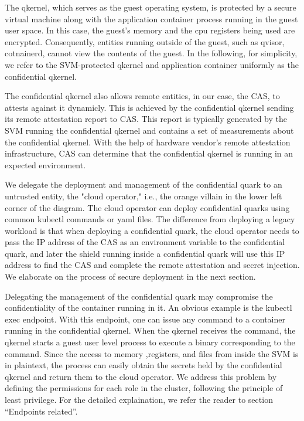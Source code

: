 The qkernel, which serves as the guest operating system, is protected by a secure virtual machine along with the application container process running in the guest user space. In this case, the guest's memory and the cpu registers being used are encrypted. Consequently, entities running outside of the guest, such as qvisor, cotnainerd, cannot view the contents of the guest.
In the following, for simplicity, we refer to the SVM-protected qkernel and application container uniformly as the confidential qkernel. 

The confidential qkernel also allows remote entities, in our case, the CAS, to attests against it dynamicly. This is achieved by the confidential qkernel sending its remote attestation report to CAS. 
This report is typically generated by the SVM running the confidential qkernel and contains a set of measurements about the confidential qkernel. With the help of hardware vendor's remote attestation infrastructure, CAS can determine that the 
confidential qkernel is running in an expected environment.

We delegate the deployment and management of the confidential quark to an untrusted entity, the "cloud operator," i.e., the orange villain in the lower left corner of the diagram. The cloud operator can deploy confidential quarks using 
common kubectl commands or yaml files. The difference from deploying a legacy workload is that when deploying a confidential quark, the cloud operator needs to pass 
the IP address of the CAS as an environment variable to the confidential quark, and later the shield running inside a confidential quark will use this IP address to find the CAS and complete the remote attestation and secret injection. We elaborate on the process of secure deployment in the next section.

Delegating the management of the confidential quark may compromise the confidentiality of the container running in it.  An obvious example is the kubectl exec endpoint. With this endpoint, one can issue any command to a container running in the confidential qkernel. 
When the qkernel receives the command, the qkernel starts a guest user level process to execute a binary corresponding to the command. Since the access to memory ,registers, and files from inside the SVM is in plaintext, the process can easily obtain 
the secrets held by the confidential qkernel and return them to the cloud operator. We address this problem by defining the permissions for each role in the cluster, following the principle of least privilege. 
For the detailed explaination, we refer the reader to section “Endpoints related”.


